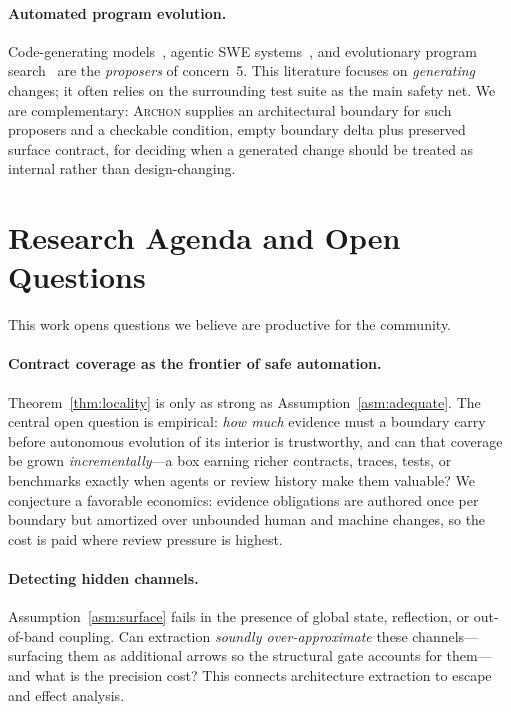 \documentclass[sigconf,review,anonymous]{acmart}
\theoremstyle{plain}
\theoremstyle{definition}
\begin{document}
\paragraph{Automated program evolution.}
Code-generating models~\cite{chen2021codex}, agentic SWE
systems~\cite{yang2024sweagent,jimenez2024swebench}, and evolutionary
program search~\cite{romera2024funsearch,lehman2023evolution} are the
\emph{proposers} of concern~5. This literature focuses on \emph{generating}
changes; it often relies on the surrounding test suite as the main safety net.
We are complementary: \textsc{Archon} supplies an architectural boundary for
such proposers and a checkable condition, empty boundary delta plus preserved
surface contract, for deciding when a generated change should be treated as
internal rather than design-changing.

\section{Research Agenda and Open Questions}\label{sec:agenda}

This work opens questions we believe are productive for the community.

\paragraph{Contract coverage as the frontier of safe automation.}
Theorem~\ref{thm:locality} is only as strong as
Assumption~\ref{asm:adequate}. The central open question is empirical: \emph{how
much} evidence must a boundary carry before autonomous evolution of its interior
is trustworthy, and can that coverage be grown \emph{incrementally}---a box
earning richer contracts, traces, tests, or benchmarks exactly when agents or
review history make them valuable? We conjecture a favorable economics:
evidence obligations are authored once per boundary but amortized over unbounded
human and machine changes, so the cost is paid where review pressure is highest.

\paragraph{Detecting hidden channels.}
Assumption~\ref{asm:surface} fails in the presence of global state, reflection,
or out-of-band coupling. Can extraction \emph{soundly over-approximate} these
channels---surfacing them as additional arrows so the structural gate accounts
for them---and what is the precision cost? This connects architecture
extraction to escape and effect analysis.
\end{document}
